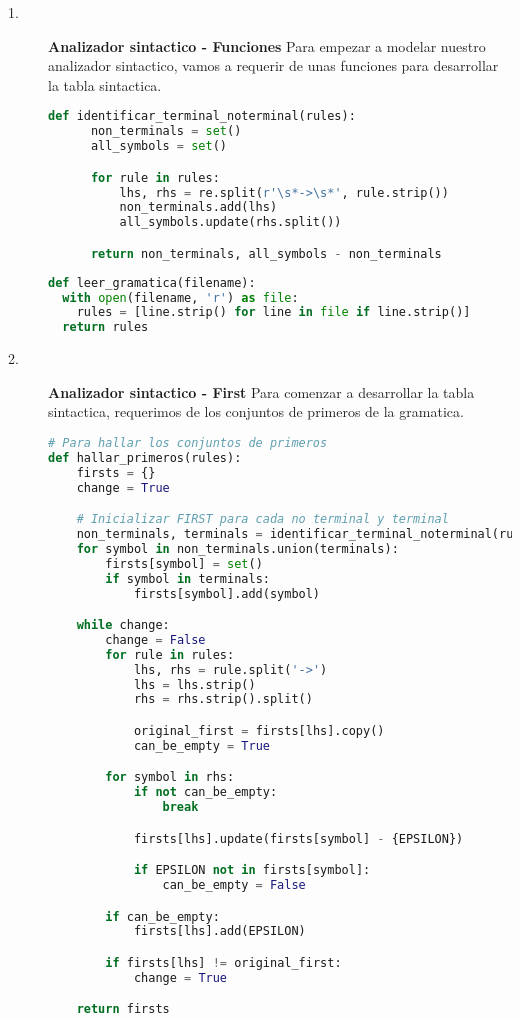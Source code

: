 \documentclass{article}
\begin{document}
\begin{description}
\item[1. ] \textbf{Analizador sintactico - Funciones} Para empezar a modelar nuestro analizador sintactico, vamos a requerir de unas funciones para desarrollar la tabla sintactica.

\begin{lstlisting}[language=Python, caption=Funcion: Identificar terminal y no terminal]
def identificar_terminal_noterminal(rules):
      non_terminals = set()
      all_symbols = set()

      for rule in rules:
          lhs, rhs = re.split(r'\s*->\s*', rule.strip())
          non_terminals.add(lhs)
          all_symbols.update(rhs.split())

      return non_terminals, all_symbols - non_terminals
\end{lstlisting}

\begin{lstlisting}[language=Python, caption=Funcion: Leer Gramatica LL1]
def leer_gramatica(filename):
  with open(filename, 'r') as file:
    rules = [line.strip() for line in file if line.strip()]
  return rules
\end{lstlisting}
\end{description}

\begin{description}
\item[2. ] \textbf{Analizador sintactico - First} Para comenzar a desarrollar la tabla sintactica, requerimos de los conjuntos de primeros de la gramatica.

\begin{lstlisting}[language=Python, caption=Funcion: Hallar conjuntos de primeros]
# Para hallar los conjuntos de primeros
def hallar_primeros(rules):
    firsts = {}
    change = True

    # Inicializar FIRST para cada no terminal y terminal
    non_terminals, terminals = identificar_terminal_noterminal(rules)
    for symbol in non_terminals.union(terminals):
        firsts[symbol] = set()
        if symbol in terminals:
            firsts[symbol].add(symbol)

    while change:
        change = False
        for rule in rules:
            lhs, rhs = rule.split('->')
            lhs = lhs.strip()
            rhs = rhs.strip().split()

            original_first = firsts[lhs].copy()
            can_be_empty = True

        for symbol in rhs:
            if not can_be_empty:
                break

            firsts[lhs].update(firsts[symbol] - {EPSILON})

            if EPSILON not in firsts[symbol]:
                can_be_empty = False

        if can_be_empty:
            firsts[lhs].add(EPSILON)

        if firsts[lhs] != original_first:
            change = True

    return firsts
\end{lstlisting}
\end{description}
\end{document}
